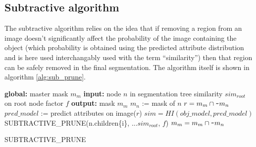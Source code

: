 \documentclass[10pt,twocolumn,letterpaper]{article}
\begin{document}
\subsection{Subtractive algorithm}
\label{sec:sub}

The subtractive algorithm relies on the idea that if removing a region from
an image doesn't significantly affect the probability of the image containing
the object (which probability is obtained using the predicted attribute
distribution and is here used interchangably used with the term ``similarity'')
then that region can be safely removed in the final segmentation.
The algorithm itself is shown in algorithm \ref{alg:sub_prune}.

\begin{algorithm}
\begin{algorithmic}
  \STATE \textbf{global:}
  \STATE \hspace{3 mm} master mask $m_m$
  \STATE \textbf{input:}
  \STATE \hspace{3 mm} node $n$ in segmentation tree
  \STATE \hspace{3 mm} similarity $sim_{root}$ on root node
  \STATE \hspace{3 mm} factor $f$
  \STATE \textbf{output:}
  \STATE \hspace{3 mm} mask $m_m$
  \STATE
  \STATE $m_n$ := mask of $n$
  \STATE $r = m_{m} \cap \verb+~+ m_{n}$
  \STATE $pred\_model$ := predict attributes on image($r$)
  \STATE $sim=HI(obj\_model,pred\_model)$
      \STATE SUBTRACTIVE\_PRUNE(n.children\{i\},
      \STATE ...$sim_{root}$, $f$)
    \ENDFOR
  \ELSE
    \STATE $m_m = m_m \cap \verb+~+ m_n$
  \ENDIF
\end{algorithmic}
\caption{SUBTRACTIVE\_PRUNE}
\label{alg:sub_prune}
\end{algorithm}
\end{document}
